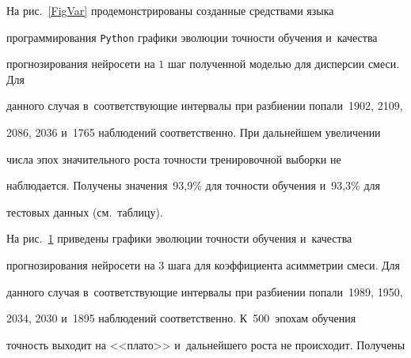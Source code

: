 \begin{figure}[b]




\vspace*{-9pt}


\begin{minipage}[t]{63mm}


\label{FigSkew}


\end{minipage}


\end{figure}





На рис.~\ref{FigVar} продемонстрированы созданные средствами языка 


программирования \verb"Python" графики эволюции точности обучения и~качества 


прогнозирования нейросети на $1$ шаг полученной моделью для дисперсии смеси. Для 


данного случая в~соответствующие интервалы при разбиении попали~1902, 2109, 


2086, 2036 и~1765 наблюдений соответственно. При дальнейшем увеличении 


числа эпох значительного роста точности тренировочной выборки не 


наблюдается. Получены значения~93{,}9\% для точности обучения и~93{,}3\% для 


тестовых данных (см.\ таблицу).











На рис.~\ref{FigSkew} приведены графики эволюции точности обучения и~качества 


прогнозирования нейросети на $3$ шага для коэффициента асимметрии смеси. Для 


данного случая в~соответствующие интервалы при разбиении попали~1989, 1950, 


2034, 2030 и~1895 наблюдений соответственно. К~500~эпохам обучения 


точность выходит на <<плато>> и~дальнейшего роста не происходит. Получены 


